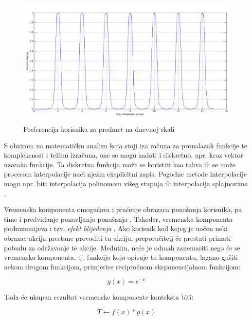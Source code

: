 \documentclass[times, utf8, diplomski, numeric]{fer}
\begin{document}
\begin{figure}[H]
	\centering
	\includegraphics[width=14.21cm]{images/neprigusenocropped.png}
	\caption{Preferencija korisnika za predmet na dnevnoj skali}
	\label{fig:Gauss2}
\end{figure}

S obzirom na matematičku analizu koja stoji iza računa za pronalazak funkcije te
kompleksnost i težinu izračuna, one se mogu zadati i diskretno, npr. kroz vektor
uzoraka funkcije. Ta diskretna funkcija može se koristiti kao takva ili se može
procesom interpolacije naći njezin eksplicitni zapis. Pogodne metode
interpolacije mogu npr. biti interpolacija polinomom višeg stupnja ili
interpolacija splajnovima .

Vremenska komponenta omogućava i praćenje obrazaca ponašanja korisnika, pa time
i predviđanje ponavljanja ponašanja . Također, vremenska
komponenta podrazumijeva i tzv. \emph{efekt blijeđenja} .
Ako korisnik kod kojeg je uočen neki obrazac akcija prestane provoditi tu
akciju, preporučitelj će prestati primati pobudu za održavanje te akcije.
Međutim, neće je odmah zanemariti nego će se vremenska komponenta, tj. funkcija
koja opisuje tu komponentu, lagano gušiti nekom drugom funkcijom, primjerice
recipročnom eksponencijalnom funkcijom:

\begin{equation}
	\label{eq:RecipExp}
	g(x) = e^{-x}
\end{equation}

Tada će ukupan rezultat vremenske komponente konteksta biti:

\begin{equation}
	\label{eq:Gusenje}
	T \leftarrow f(x) \ast g(x)
\end{equation}
\end{document}
